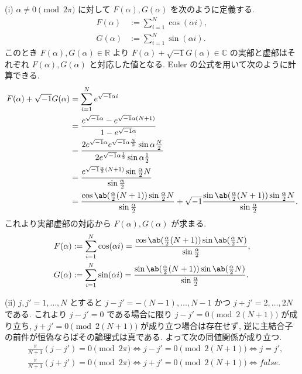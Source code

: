 \documentclass[uplatex,diffipdfmx,a4paper,11pt]{jlreq}
\newcommand{\CC}{\mathbb{C}}
\newcommand{\RR}{\mathbb{R}}
\theoremstyle{definition}
\begin{document}
(i) $\alpha \neq 0 \pmod{2\pi}$ に対して $F(\alpha), G(\alpha)$ を次のように定義する.
\begin{align}
  F(\alpha) & := \sum_{i=1}^{N}\cos(\alpha i), \\
  G(\alpha) & := \sum_{i=1}^{N}\sin(\alpha i).
\end{align}
このとき $F(\alpha), G(\alpha)\in\RR$ より $F(\alpha) + \sqrt{-1}G(\alpha)\in\CC$ の実部と虚部はそれぞれ $F(\alpha), G(\alpha)$ と対応した値となる. Euler の公式を用いて次のように計算できる.
\begin{align}
  F(\alpha) + \sqrt{-1}G(\alpha) & = \sum_{i=1}^{N}e^{\sqrt{-1}\alpha i}                                                                                                                                                   \\
                                 & = \frac{e^{\sqrt{-1}\alpha} - e^{\sqrt{-1}\alpha (N+1)}}{1 - e^{\sqrt{-1}\alpha}}                                                                                                       \\
                                 & = \frac{2e^{\sqrt{-1}\alpha}e^{\sqrt{-1}\alpha \frac{N}{2}}\sin{\alpha \frac{N}{2}}}{2e^{\sqrt{-1}\alpha\frac{1}{2}}\sin{\alpha\frac{1}{2}}}                                            \\
                                 & = \frac{e^{\sqrt{-1}\frac{\alpha}{2}(N+1)}\sin{\frac{\alpha}{2}N}}{\sin{\frac{\alpha}{2}}}                                                                                              \\
                                 & = \frac{\cos\ab(\frac{\alpha}{2}(N+1))\sin{\frac{\alpha}{2}N}}{\sin{\frac{\alpha}{2}}} + \sqrt{-1}\frac{\sin\ab(\frac{\alpha}{2}(N+1))\sin{\frac{\alpha}{2}N}}{\sin{\frac{\alpha}{2}}}.
\end{align}
これより実部虚部の対応から $F(\alpha), G(\alpha)$ が求まる.
\begin{align}
  F(\alpha) & := \sum_{i=1}^{N}\cos(\alpha i) = \frac{\cos\ab(\frac{\alpha}{2}(N+1))\sin\ab(\frac{\alpha}{2}N)}{\sin{\frac{\alpha}{2}}}, \\
  G(\alpha) & := \sum_{i=1}^{N}\sin(\alpha i) = \frac{\sin\ab(\frac{\alpha}{2}(N+1))\sin\ab(\frac{\alpha}{2}N)}{\sin{\frac{\alpha}{2}}}.
\end{align}

(ii) $j, j' = 1,\ldots,N$ とすると $j - j' = -(N - 1),\ldots,N - 1$ かつ $j + j' = 2,\ldots,2N$ である. これより $j - j' = 0$ である場合に限り $j - j' = 0 \pmod{2(N+1)}$ が成り立ち, $j + j' = 0 \pmod{2(N+1)}$ が成り立つ場合は存在せず, 逆に主結合子の前件が恒偽ならばその論理式は真である. よって次の同値関係が成り立つ.
\begin{align}
   & \frac{\pi}{N+1}(j - j') = 0 \pmod{2\pi} \iff j - j' = 0 \pmod{2(N+1)} \iff j = j', \label{Q17-3. ii-1} \\
   & \frac{\pi}{N+1}(j + j') = 0 \pmod{2\pi} \iff j + j' = 0 \pmod{2(N+1)} \iff false. \label{Q17-3. ii-2}
\end{align}
\end{document}
